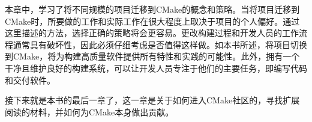 
本章中，学习了将不同规模的项目迁移到CMake的概念和策略。当将项目迁移到CMake时，所要做的工作和实际工作在很大程度上取决于项目的个人偏好。通过这里描述的方法，选择正确的策略将会更容易。更改构建过程和开发人员的工作流程通常具有破坏性，因此必须仔细考虑是否值得这样做。如本书所述，将项目切换到CMake，将为构建高质量软件提供所有特性和实践的可能性。此外，拥有一个干净且维护良好的构建系统，可以让开发人员专注于他们的主要任务，即编写代码和交付软件。

接下来就是本书的最后一章了，这一章是关于如何进入CMake社区的，寻找扩展阅读的材料，并如何为CMake本身做出贡献。